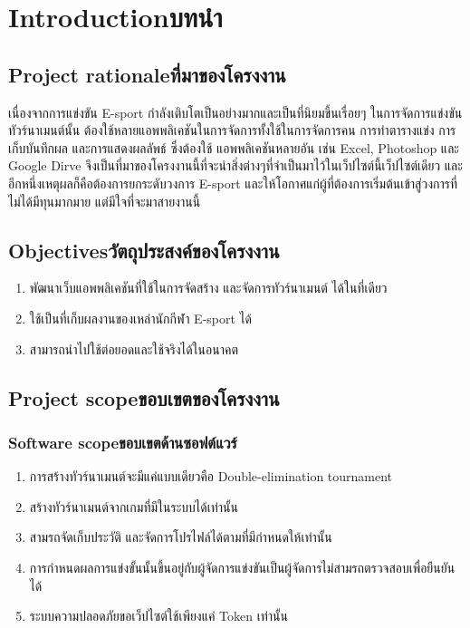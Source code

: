 \chapter{\ifenglish Introduction\else บทนำ\fi}

\section{\ifenglish Project rationale\else ที่มาของโครงงาน\fi}
เนื่องจากการแข่งขัน E-sport กำลังเติบโตเป็นอย่างมากและเป็นที่นิยมขึ้นเรื่อยๆ ในการจัดการแข่งขันทัวร์นาเมนต์นั้น
ต้องใช้หลายแอพพลิเคชันในการจัดการทั้งใช้ในการจัดการคน การทำตารางแข่ง การเก็บบันทึกผล และการแสดงผลลัพธ์ ซึ่งต้องใช้
แอพพลิเคชันหลายอัน เช่น Excel, Photoshop และ Google Dirve   จึงเป็นที่มาของโครงงานนี้ที่จะนำสิ่งต่างๆที่จำเป็นมาไว้ในเว็ปไซต์นี้เว็ปไซต์เดียว
และ อีกหนึ่งเหตุผลก็คือต้องการยกระดับวงการ E-sport และให้โอกาศแก่ผู้ที่ต้องการเริ่มต้นเข้าสู่วงการที่ไม่ได้มีทุนมากมาย แต่มีใจที่จะมาสายงานนี้  


\section{\ifenglish Objectives\else วัตถุประสงค์ของโครงงาน\fi}
\begin{enumerate}
    \item พัฒนาเว็บแอพพลิเคชันที่ใช้ในการจัดสร้าง และจัดการทัวร์นาเมนต์ ได้ในที่เดียว
    \item ใช้เป็นที่เก็บผลงานของเหล่านักกีฬา E-sport ได้
    \item สามารถนำไปใช้ต่อยอดและใช้จริงได้ในอนาคต
\end{enumerate}

\section{\ifenglish Project scope\else ขอบเขตของโครงงาน\fi}

\subsection{\ifenglish Software scope\else ขอบเขตด้านซอฟต์แวร์\fi}
\begin{enumerate}
    \item การสร้างทัวร์นาเมนต์จะมีแค่แบบเดียวคือ Double-elimination tournament \cite{tournament}
    \item สร้างทัวร์นาเมนต์จากเกมที่มีในระบบได้เท่านั้น 
    \item สามรถจัดเก็บประวัติ และจัดการโปรไฟล์ได้ตามที่มีกำหนดให้เท่านั้น
    \item การกำหนดผลการแข่งขั้นนั้นขึ้นอยู่กับผู้จัดการแข่งขันเป็นผู้จัดการไม่สามรถตรวจสอบเพื่อยืนยันได้
    \item ระบบความปลอดภัยขอเว็ปไซต์ใช้เพียงแค่ Token เท่านั้น
\end{enumerate}

